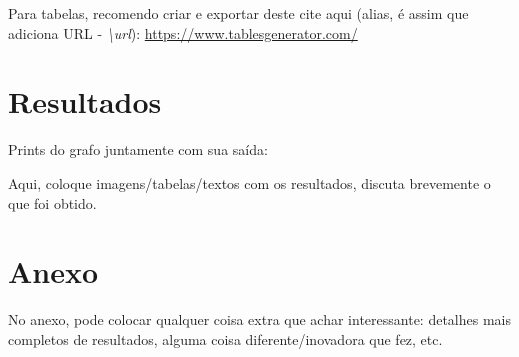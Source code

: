 \documentclass[a4paper, 12pt]{article}
\begin{document}
Para tabelas, recomendo criar e exportar deste cite aqui (alias, é assim que adiciona URL -  \textit{\textbackslash url}): \url{https://www.tablesgenerator.com/}

\newpage
\section{Resultados}
Prints do grafo juntamente com sua saída:


Aqui, coloque imagens/tabelas/textos com os resultados, discuta brevemente o que foi obtido.
\newpage


\newpage
{}
\section*{Anexo}
No anexo, pode colocar qualquer coisa extra que achar interessante: detalhes mais completos de resultados, alguma coisa diferente/inovadora que fez, etc.
\end{document}
